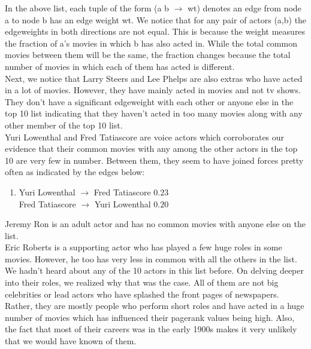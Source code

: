 \documentclass{article}
\begin{document}
In the above list, each tuple of the form (a b $\rightarrow$ wt) denotes an edge from node a to node b has an edge weight wt.
We notice that for any pair of actors (a,b) the edgeweights in both directions are not equal. This is because the weight 
measures the fraction of a's movies in which b has also acted in. While the total common movies between them will be the same,
the fraction changes because the total number of movies in which each of them has acted is different.\\

Next, we notice that Larry Steers and Lee Phelps are also extras who have acted in a lot of movies. However, they have mainly
acted in movies and not tv shows. They don't have a significant edgeweight with each other or anyone else in the top 10 list
indicating that they haven't acted in too many movies along with any other member of the top 10 list.\\

Yuri Lowenthal and Fred Tatiascore are voice actors which corroborates our evidence that their common movies with any among
the other actors in the top 10 are very few in number. Between them, they seem to have joined forces pretty often as indicated
by the edges below:
\begin{enumerate}
\item
 Yuri Lowenthal $\rightarrow$ Fred Tatiascore $0.23$\\
 Fred Tatiascore $\rightarrow$ Yuri Lowenthal $0.20$
 \end{enumerate}
Jeremy Ron is an adult actor and has no common movies with anyone else on the list.\\

Eric Roberts is a supporting actor who has played a few huge roles in some movies. However, he too has very less in common
with all the others in the list.\\

We hadn't heard about any of the 10 actors in this list before. On delving deeper into their roles, we realized why that was
the case. All of them are not big celebrities or lead actors who have splashed the front pages of newspapers. Rather, they are
mostly people who perform short roles and have acted in a huge number of movies which has influenced their pagerank values being
high. Also, the fact that most of their careers was in the early 1900s makes it very unlikely that we would have known of them.\\
\end{document}
